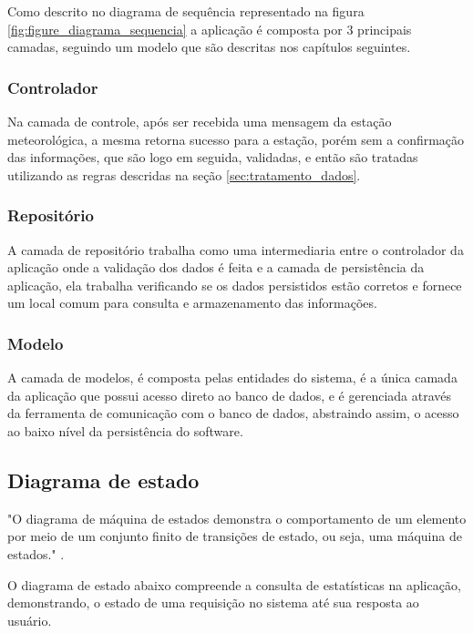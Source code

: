 Como descrito no diagrama de sequência representado na figura \ref{fig:figure_diagrama_sequencia} a aplicação é composta por 3 principais camadas, seguindo um modelo que são descritas nos capítulos seguintes.

\subsubsection{Controlador}

Na camada de controle, após ser recebida uma mensagem da estação meteorológica, a mesma retorna sucesso para a estação, porém sem a confirmação das informações, que são logo em seguida, validadas, e então são tratadas utilizando as regras descridas na seção \ref{sec:tratamento_dados}.

\subsubsection{Repositório}

A camada de repositório trabalha como uma intermediaria entre o controlador da aplicação onde a validação dos dados é feita e a camada de persistência da aplicação, ela trabalha verificando se os dados persistidos estão corretos e fornece um local comum para consulta e armazenamento das informações.

\subsubsection{Modelo}

A camada de modelos, é composta pelas entidades do sistema, é a única camada da aplicação que possui acesso direto ao banco de dados, e é gerenciada através da ferramenta de comunicação com o banco de dados, abstraindo assim, o acesso ao baixo nível da persistência do software.

\subsection{Diagrama de estado}
\label{sec:diagrama_estado}

"O diagrama de máquina de estados demonstra o comportamento de um elemento por meio de um conjunto finito de transições de estado, ou seja, uma máquina de estados." \cite{uml_pratica}.

O diagrama de estado abaixo compreende a consulta de estatísticas na aplicação, demonstrando, o estado de uma requisição no sistema até sua resposta ao usuário.

